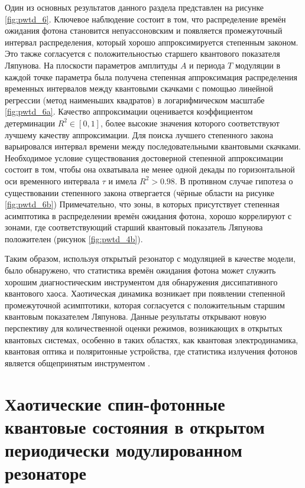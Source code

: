 Один из основных результатов данного раздела представлен на рисунке \cref{fig:pwtd_6}.
Ключевое наблюдение состоит в том, что распределение времён ожидания фотона становится непуассоновским и появляется промежуточный интервал распределения, который хорошо аппроксимируется степенным законом. Это также согласуется с положительностью старшего квантового показателя Ляпунова.
На плоскости параметров амплитуды $A$ и периода $T$ модуляции в каждой точке параметра была получена степенная аппроксимация распределения временных интервалов между квантовыми скачками с помощью линейной регрессии (метод наименьших квадратов) в логарифмическом масштабе \cref{fig:pwtd_6a}.
Качество аппроксимации оценивается коэффициентом детерминации \cite{Draper1998} $R^2 \in \left[0, 1\right]$, более высокие значения которого соответствуют лучшему качеству аппроксимации.
Для поиска лучшего степенного закона варьировался интервал времени между последовательными квантовыми скачками. Необходимое условие существования достоверной степенной аппроксимации состоит в том, чтобы она охватывала не менее одной декады по горизонтальной оси временного интервала $\tau$ и имела $R^2> 0.98$.
В противном случае гипотеза о существовании степенного закона отвергается (чёрные области на рисунке \cref{fig:pwtd_6b})  Примечательно, что зоны, в которых присутствует степенная асимптотика в распределении времён ожидания фотона, хорошо коррелируют с зонами, где соответствующий старший квантовый показатель Ляпунова положителен (рисунок \cref{fig:pwtd_4b}).

Таким образом, используя открытый резонатор с модуляцией в качестве модели, было обнаружено, что статистика времён ожидания фотона может служить хорошим диагностическим инструментом для обнаружения диссипативного квантового хаоса.
Хаотическая динамика возникает при появлении степенной промежуточной асимптотики, которая согласуется с положительным старшим квантовым показателем Ляпунова.
Данные результаты открывают новую перспективу для количественной оценки режимов, возникающих в открытых квантовых системах, особенно в таких областях, как квантовая электродинамика, квантовая оптика и поляритонные устройства, где статистика излучения фотонов является общепринятым инструментом \cite{Delteil2014, Brange2019}. 

\section{Хаотические спин-фотонные квантовые состояния в открытом периодически модулированном резонаторе}\label{sec:ch3/csp}

